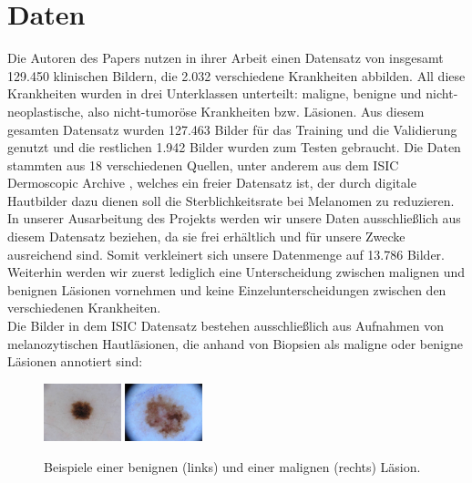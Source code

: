 \documentclass[%
   10pt,              %
   a4paper,           %
   DIV10,             %
]{scrartcl}%
\begin{document}
\section*{Daten}

Die Autoren des Papers nutzen in ihrer Arbeit einen Datensatz von insgesamt 129.450 klinischen Bildern, die 2.032 verschiedene Krankheiten abbilden. All diese Krankheiten wurden in drei Unterklassen unterteilt: maligne, benigne und nicht-neoplastische, also nicht-tumoröse Krankheiten bzw. Läsionen. Aus diesem gesamten Datensatz wurden 127.463 Bilder für das Training und die Validierung genutzt und die restlichen 1.942 Bilder wurden zum Testen gebraucht. Die Daten stammten aus 18 verschiedenen Quellen, unter anderem aus dem ISIC Dermoscopic Archive \cite{ISIC}, welches ein freier Datensatz ist, der durch digitale Hautbilder dazu dienen soll die Sterblichkeitsrate bei Melanomen zu reduzieren. In unserer Ausarbeitung des Projekts werden wir unsere Daten ausschließlich aus diesem Datensatz beziehen, da sie frei erhältlich und für unsere Zwecke ausreichend sind. Somit verkleinert sich unsere Datenmenge auf 13.786 Bilder. Weiterhin werden wir zuerst lediglich eine Unterscheidung zwischen malignen und benignen Läsionen vornehmen und keine Einzelunterscheidungen zwischen den verschiedenen Krankheiten.\\
\noindent Die Bilder in dem ISIC Datensatz bestehen ausschließlich aus Aufnahmen von melanozytischen Hautläsionen, die anhand von Biopsien als maligne oder benigne Läsionen annotiert sind: 

\begin{figure}[h!]
	\centering
	\includegraphics[width=0.2\textwidth]{fig/example1.jpg}
	\includegraphics[width=0.2\textwidth]{fig/example2.jpg}
	\caption{Beispiele einer benignen (links) und einer malignen (rechts) Läsion.}
	\label{fig_example}
\end{figure}
\end{document}
